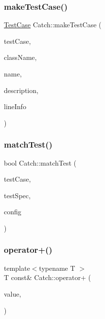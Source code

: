\hypertarget{namespace_catch_a2a784590bb5068810d3f6013fed1f1d3}{}\label{namespace_catch_a2a784590bb5068810d3f6013fed1f1d3} 
\subsubsection{\texorpdfstring{make\+Test\+Case()}{makeTestCase()}}
{\footnotesize\ttfamily \hyperlink{class_catch_1_1_test_case}{Test\+Case} Catch\+::make\+Test\+Case (\begin{DoxyParamCaption}\item[{\hyperlink{struct_catch_1_1_i_test_case}{I\+Test\+Case} $\ast$}]{test\+Case,  }\item[{std\+::string const \&}]{class\+Name,  }\item[{std\+::string const \&}]{name,  }\item[{std\+::string const \&}]{description,  }\item[{\hyperlink{struct_catch_1_1_source_line_info}{Source\+Line\+Info} const \&}]{line\+Info }\end{DoxyParamCaption})}

\hypertarget{namespace_catch_aadef80fbc6bc84589777a462770cef49}{}\label{namespace_catch_aadef80fbc6bc84589777a462770cef49} 
\subsubsection{\texorpdfstring{match\+Test()}{matchTest()}}
{\footnotesize\ttfamily bool Catch\+::match\+Test (\begin{DoxyParamCaption}\item[{\hyperlink{class_catch_1_1_test_case}{Test\+Case} const \&}]{test\+Case,  }\item[{Test\+Spec const \&}]{test\+Spec,  }\item[{I\+Config const \&}]{config }\end{DoxyParamCaption})}

\hypertarget{namespace_catch_a5e95b3c47a7618db3649dc39b0bb9004}{}\label{namespace_catch_a5e95b3c47a7618db3649dc39b0bb9004} 
\subsubsection{\texorpdfstring{operator+()}{operator+()}}
{\footnotesize\ttfamily template$<$typename T $>$ \\
T const\& Catch\+::operator+ (\begin{DoxyParamCaption}\item[{T const \&}]{value,  }\item[{\hyperlink{struct_catch_1_1_stream_end_stop}{Stream\+End\+Stop}}]{ }\end{DoxyParamCaption})}



